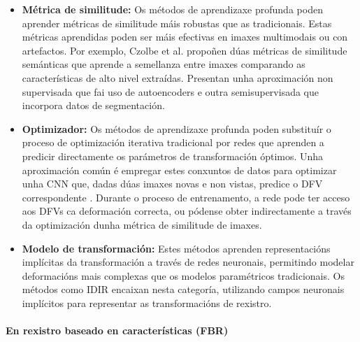 \begin{itemize}
\item \textbf{Métrica de similitude:} Os métodos de aprendizaxe profunda poden aprender métricas de similitude máis robustas que as tradicionais. Estas métricas aprendidas poden ser máis efectivas en imaxes multimodais ou con artefactos.
Por exemplo, Czolbe et al. \cite{semanticsimilarity} propoñen dúas métricas de similitude semánticas que aprende a semellanza entre imaxes comparando as características de alto nivel extraídas. Presentan unha aproximación non supervisada que fai uso de autoencoders e outra semisupervisada que incorpora datos de segmentación.
\item \textbf{Optimizador:} Os métodos de aprendizaxe profunda poden substituír o proceso de optimización iterativa tradicional por redes que aprenden a predicir directamente os parámetros de transformación óptimos. Unha aproximación común é empregar estes conxuntos de datos para optimizar unha CNN que, dadas dúas imaxes novas e non vistas, predice o DFV correspondente \cite{defregcnn}. Durante o proceso de entrenamento, a rede pode ter acceso aos DFVs ca deformación correcta, ou pódense obter indirectamente a través da optimización dunha métrica de similitude de imaxes.
\item \textbf{Modelo de transformación:} Estes métodos aprenden representacións implícitas da transformación a través de redes neuronais, permitindo modelar deformacións mais complexas que os modelos paramétricos tradicionais. Os métodos como IDIR \cite{wolterink2021implicit} encaixan nesta categoría, utilizando campos neuronais implícitos para representar as transformacións de rexistro.
\end{itemize}



\paragraph{En rexistro baseado en características (FBR)}
\label{par:FBR_substitution}

